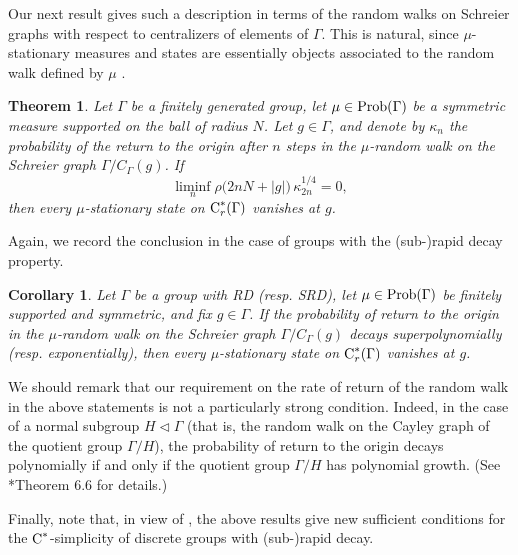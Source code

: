 \documentclass[12pt]{amsart}
\newtheorem{theo}{Theorem}
\newtheorem{coro}{Corollary}
\theoremstyle{definition}
\theoremstyle{remark}
\newcommand{\G}{\Gamma}
\begin{document}
Our next result gives such a description in terms of the random walks on Schreier graphs with respect to centralizers of elements of $\Gamma$. This is natural, since $\mu$-stationary measures and states are essentially objects associated to the random walk defined by $\mu$ \cite{Furstenberg73}.


\begin{theo}\label{thm:Gong}
Let $\G$ be a finitely generated group, let $\mu\in{\rm Prob}(\G)$ be a symmetric measure supported on the ball of radius $N$. Let $g\in\Gamma$, and denote by $\kappa_n$ the probability of the return to the origin after $n$ steps in the $\mu$-random walk on the Schreier graph $\G/C_\G(g)$.
If 
\[
\liminf_n \rho\big(2nN+|g|\big)\,\kappa_{2n}^{1/4} = 0 ,
\]
then every $\mu$-stationary state on $\textup{C}^*_r(\G)$ vanishes at $g$.
\end{theo}


Again, we record the conclusion in the case of groups with the (sub-)rapid decay property.

\begin{coro}\label{cor:stn}
Let $\Gamma$ be a group with \textup{RD} \textup{(}resp. \textup{SRD}\textup{)}, let $\mu\in{\rm Prob}(\G)$ be finitely supported and symmetric, and fix $g\in\Gamma$. If the probability of return to the origin in the $\mu$-random walk on the Schreier graph $\G/C_\G(g)$ decays superpolynomially \textup{(}resp. exponentially\textup{)}, then every $\mu$-stationary state on $\textup{C}^*_r(\G)$ vanishes at $g$. 
\end{coro}



We should remark that our requirement on the rate of return of the random walk in the above statements is not a particularly strong condition. Indeed, in the case of a normal subgroup $H\triangleleft \G$ (that is, the random walk on the Cayley graph of the quotient group $\G/H$), the probability of return to the origin decays polynomially if and only if the quotient group $\G/H$ has polynomial growth. (See \cite{Woess}*{Theorem 6.6} for details.)

\medskip

Finally, note that, in view of \cite{KK14}, the above results give new sufficient conditions for the $\textup{C}^*$-simplicity of discrete groups with (sub-)rapid decay.
\end{document}
